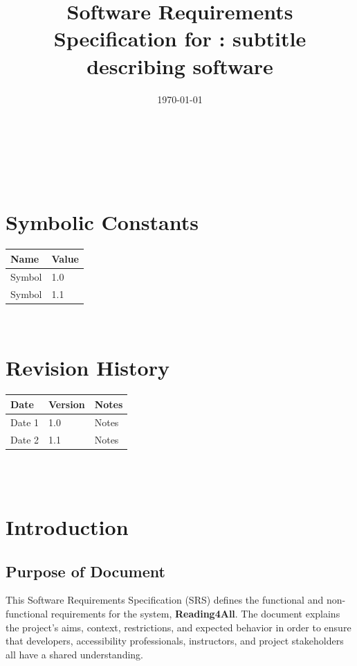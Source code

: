 \documentclass[12pt]{article}
\begin{document}
\title{Software Requirements Specification for \progname: subtitle describing software} 
\author{\authname}
\date{\today}
	
\maketitle

~\newpage


\tableofcontents
~\newpage

\section*{Symbolic Constants}
\begin{tabularx}{\textwidth}{|X|X|}
\toprule {\textbf{Name}} & {\textbf{Value}}\\
\midrule
Symbol & 1.0 \\
Symbol & 1.1 \\
\bottomrule
\end{tabularx}


~\newpage

\section*{Revision History}

\begin{tabularx}{\textwidth}{p{3cm}p{2cm}X}
\toprule {\textbf{Date}} & {\textbf{Version}} & {\textbf{Notes}}\\
\midrule
Date 1 & 1.0 & Notes\\
Date 2 & 1.1 & Notes\\
\bottomrule
\end{tabularx}

~\\

~\newpage
\section{Introduction}

\subsection{Purpose of Document}
This Software Requirements Specification (SRS) defines the functional and non-functional requirements for the \progname{} system, \textbf{Reading4All}. The document explains the project's aims, context, restrictions, and expected behavior in order to ensure that developers, accessibility professionals, instructors, and project stakeholders all have a shared understanding.
\end{document}
